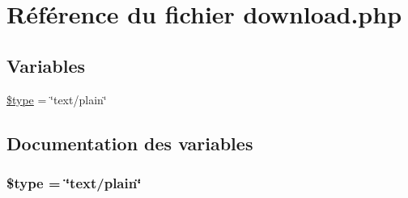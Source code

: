 \hypertarget{download_8php}{
\section{R\'{e}f\'{e}rence du fichier download.php}
\label{download_8php}
}
\subsection*{Variables}
\begin{CompactItemize}
\item 
\hyperlink{download_8php_a0}{\$type} = \char`\"{}text/plain\char`\"{}
\end{CompactItemize}


\subsection{Documentation des variables}
\hypertarget{download_8php_a0}{
\subsubsection[\$type]{\setlength{\rightskip}{0pt plus 5cm}\$type = \char`\"{}text/plain\char`\"{}}}
\label{download_8php_a0}


